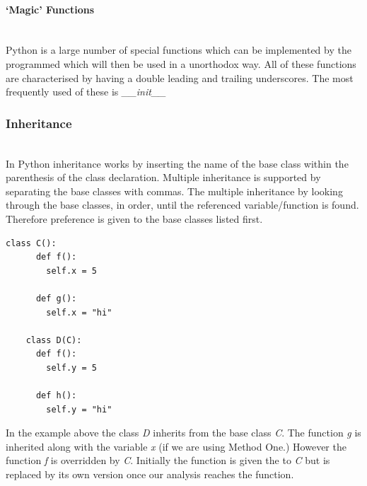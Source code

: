 \documentclass[12pt, titlepage]{article}
\begin{document}
\paragraph{`Magic' Functions}\mbox{}\\
Python is a large number of special functions which can be implemented by the programmed which will then be used in a unorthodox way. All of these functions are characterised by having a double leading and trailing underscores. The most frequently used of these is \textit{\_\_init\_\_}

\subsubsection{Inheritance}\mbox{}\\
In Python inheritance works by inserting the name of the base class within the parenthesis of the class declaration. Multiple inheritance is supported by separating the base classes with commas. The multiple inheritance by looking through the base classes, in order, until the referenced variable/function is found. Therefore preference is given to the base classes listed first.
\begin{lstlisting}[mathescape]
	class C():
	  def f():
	    self.x = 5
		
	  def g():
	    self.x = "hi"

	class D(C):
	  def f():
	    self.y = 5
		
	  def h():
	    self.y = "hi"
\end{lstlisting}
In the example above the class \textit{D} inherits from the base class \textit{C}. The function \textit{g} is inherited along with the variable \textit{x} (if we are using Method One.) However the function \textit{f} is overridden by \textit{C}. Initially the function is given the to \textit{C} but is replaced by its own version once our analysis reaches the function.
\end{document}
